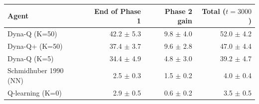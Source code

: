 \begin{tabular}{lrrr}
\toprule
Agent & End of Phase 1 & Phase 2 gain & Total ($t = 3000$) \\
\midrule
Dyna-Q (K=50) & 42.2 $\pm$ 5.3 & 9.8 $\pm$ 4.0 & 52.0 $\pm$ 4.2 \\
Dyna-Q+ (K=50) & 37.4 $\pm$ 3.7 & 9.6 $\pm$ 2.8 & 47.0 $\pm$ 4.4 \\
Dyna-Q (K=5) & 34.4 $\pm$ 4.9 & 4.8 $\pm$ 3.0 & 39.2 $\pm$ 4.7 \\
Schmidhuber 1990 (NN) & 2.5 $\pm$ 0.3 & 1.5 $\pm$ 0.2 & 4.0 $\pm$ 0.4 \\
Q-learning (K=0) & 2.9 $\pm$ 0.5 & 0.6 $\pm$ 0.2 & 3.5 $\pm$ 0.5 \\
\bottomrule
\end{tabular}
